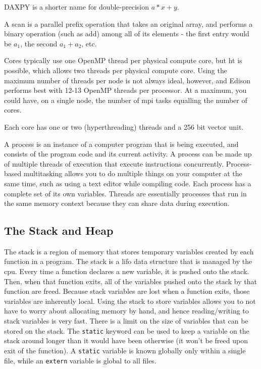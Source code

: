 \documentclass[10pt]{article}
\begin{document}
\begin{flushleft}
DAXPY is a shorter name for double-precision \(a*x+y\). 

A scan is a parallel prefix operation that takes an original array, and performs a binary operation (such as add) among all of its elements - the first entry would be \(a_1\), the second \(a_1+a_2\), etc. 

Cores typically use one OpenMP thread per physical compute core, but \gls{ht} is possible, which allows two threads per physical compute core.   Using the maximum number of threads per node is not always ideal, however, and Edison performs best with 12-13 OpenMP threads per processor. At a maximum, you could have, on a single node, the number of \gls{mpi} tasks equalling the number of cores.

Each core has one or two (hyperthreading) threads and a 256 bit vector unit. 

A process is an instance of a computer program that is being executed, and consists of the program code and its current activity. A process can be made up of multiple threads of execution that execute instructions concurrently. Process-based multitasking allows you to do multiple things on your computer at the same time, such as using a text editor while compiling code. Each process has a complete set of its own variables. Threads are essentially processes that run in the same memory context because they can share data during execution. 

\subsection{The Stack and Heap}

The stack is a region of memory that stores temporary variables created by each function in a program. The stack is a \gls{lifo} data structure that is managed by the \gls{cpu}. Every time a function declares a new variable, it is pushed onto the stack. Then, when that function exits, all of the variables pushed onto the stack by that function are freed. Because stack variables are lost when a function exits, those variables are inherently local. Using the stack to store variables allows you to not have to worry about allocating memory by hand, and hence reading/writing to stack variables is very fast. There is a limit on the size of variables that can be stored on the stack. The {\tt static} keyword can be used to keep a variable on the stack around longer than it would have been otherwise (it won't be freed upon exit of the function). A {\tt static} variable is known globally only within a single file, while an {\tt extern} variable is global to all files.


\end{flushleft}
\end{document}
